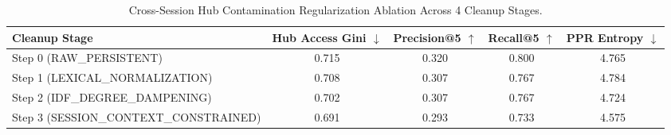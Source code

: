 \begin{table}[t]
\centering
\small
\caption{Cross-Session Hub Contamination Regularization Ablation Across 4 Cleanup Stages.}
\label{tab:hub_cleanup_ablation}
\begin{tabular}{lcccc}
\toprule
\textbf{Cleanup Stage} & \textbf{Hub Access Gini $\downarrow$} & \textbf{Precision@5 $\uparrow$} & \textbf{Recall@5 $\uparrow$} & \textbf{PPR Entropy $\downarrow$} \\
\midrule
Step 0 (RAW_PERSISTENT) & 0.715 & 0.320 & 0.800 & 4.765 \\
Step 1 (LEXICAL_NORMALIZATION) & 0.708 & 0.307 & 0.767 & 4.784 \\
Step 2 (IDF_DEGREE_DAMPENING) & 0.702 & 0.307 & 0.767 & 4.724 \\
Step 3 (SESSION_CONTEXT_CONSTRAINED) & 0.691 & 0.293 & 0.733 & 4.575 \\
\bottomrule
\end{tabular}
\end{table}